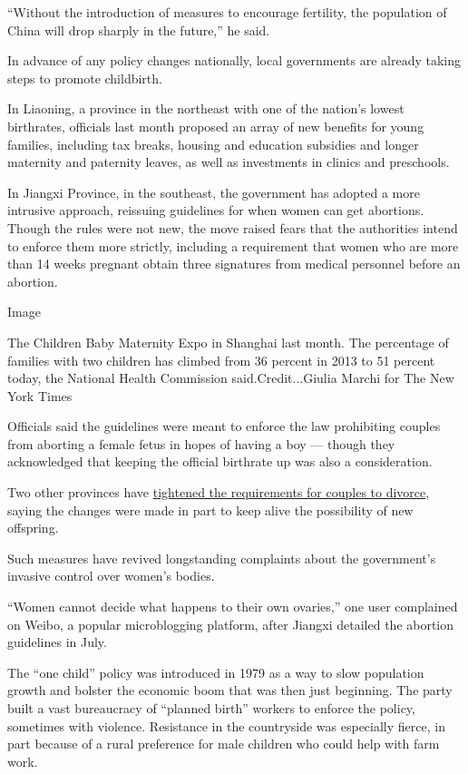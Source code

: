 ``Without the introduction of measures to encourage fertility, the
population of China will drop sharply in the future,'' he said.

In advance of any policy changes nationally, local governments are
already taking steps to promote childbirth.

In Liaoning, a province in the northeast with one of the nation's lowest
birthrates, officials last month proposed an array of new benefits for
young families, including tax breaks, housing and education subsidies
and longer maternity and paternity leaves, as well as investments in
clinics and preschools.

In Jiangxi Province, in the southeast, the government has adopted a more
intrusive approach, reissuing guidelines for when women can get
abortions. Though the rules were not new, the move raised fears that the
authorities intend to enforce them more strictly, including a
requirement that women who are more than 14 weeks pregnant obtain three
signatures from medical personnel before an abortion.

Image

The Children Baby Maternity Expo in Shanghai last month. The percentage
of families with two children has climbed from 36 percent in 2013 to 51
percent today, the National Health Commission said.Credit...Giulia
Marchi for The New York Times

Officials said the guidelines were meant to enforce the law prohibiting
couples from aborting a female fetus in hopes of having a boy --- though
they acknowledged that keeping the official birthrate up was also a
consideration.

Two other provinces have
\href{https://www.nytimes.com/2018/05/30/world/asia/china-divorce-quiz.html}{tightened
the requirements for couples to divorce}, saying the changes were made
in part to keep alive the possibility of new offspring.

Such measures have revived longstanding complaints about the
government's invasive control over women's bodies.

``Women cannot decide what happens to their own ovaries,'' one user
complained on Weibo, a popular microblogging platform, after Jiangxi
detailed the abortion guidelines in July.

The ``one child'' policy was introduced in 1979 as a way to slow
population growth and bolster the economic boom that was then just
beginning. The party built a vast bureaucracy of ``planned birth''
workers to enforce the policy, sometimes with violence. Resistance in
the countryside was especially fierce, in part because of a rural
preference for male children who could help with farm work.

